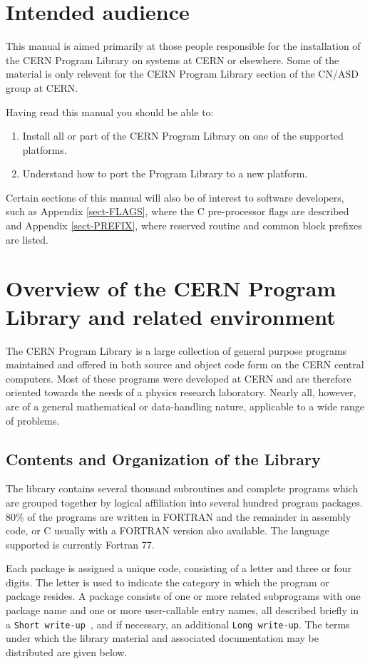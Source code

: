 \chapter{Intended audience}

This manual is aimed primarily at those people responsible for the
installation of the CERN Program Library on systems at CERN or
elsewhere. Some of the material is only relevent for the
CERN Program Library section of the CN/ASD group at CERN.

Having read this manual you should be able to:

\begin{enumerate}
\item
Install all or part of the CERN Program Library on one of the 
supported platforms.
\item
Understand how to port the Program Library to a new platform.
\end{enumerate}

Certain sections of this manual will also be of interest
to software developers, such as Appendix \ref{sect-FLAGS},
where the C pre-processor flags are described and Appendix \ref{sect-PREFIX},
where reserved routine and common block prefixes are listed.

\chapter{Overview of the CERN Program Library and related environment}
The CERN Program  Library is a large collection  of general purpose programs
maintained  and offered  in both  source and  object code  form on  the CERN
central computers.   Most of these programs  were developed at CERN  and are
therefore  oriented towards  the  needs of  a  physics research  laboratory.
Nearly all, however, are of  a general mathematical or data-handling nature,
applicable to a wide range of problems.
 
\section{Contents and Organization of the Library}
The library contains several thousand subroutines and complete programs which are
grouped  together  by  logical  affiliation into several hundred program
packages. 80\%  of the programs are  written in FORTRAN and  the remainder in
assembly code, or C  usually with  a FORTRAN  version also  available.  The
language supported is currently Fortran 77.
 
Each package is assigned a unique code, consisting of a letter
and three or four digits. The  letter is used to indicate the category
in which the program or package resides. A package  consists of one or more related
subprograms with one package name and one or more user-callable entry names,
all described briefly in a {\tt Short write-up}~\cite{bib-CERNLIB}, and if necessary, an additional
{\tt Long  write-up}.  The terms under which the library material and associated
documentation may be distributed are given below.
 
